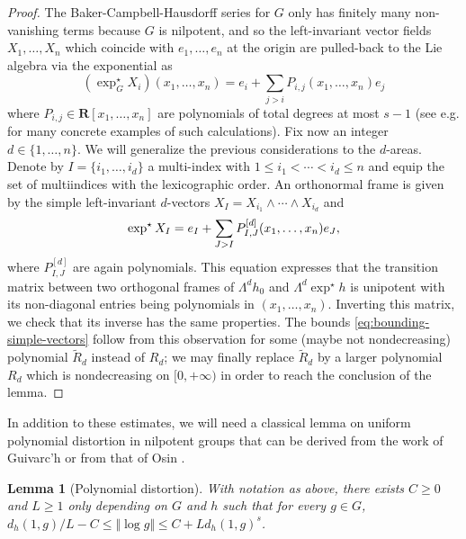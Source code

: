 \documentclass[12pt]{amsart}
\newtheorem{lem}[prop]{Lemma}
\theoremstyle{definition}
\begin{document}
\begin{proof}

The Baker-Campbell-Hausdorff series for $G$ only has finitely many non-vanishing terms because $G$ is nilpotent, and so the left-invariant vector fields $X_1,\ldots, X_n$ which coincide with $e_1, \ldots,e_n$ at the origin are pulled-back to the Lie algebra via the exponential as
\begin{equation}
\label{eq:bounding-simple-vectors-1}
     (\exp_G^\star X_i)(x_1,\ldots, x_n) = e_i + \sum_{j>i} P_{i,j}(x_1,\ldots, x_n) e_j 
\end{equation}
where $P_{i,j} \in \mathbf R[x_1,\ldots, x_n]$ are polynomials of total degrees at most $s -1$ (see e.g. \cite{LeDonneTripaldiCCLow} for many concrete examples of such calculations). 
Fix now an integer $d \in \{1,\ldots, n\}$. We will generalize the previous considerations to the $d$-areas. Denote by $I = \{i_1, \ldots, i_d \}$ a multi-index with $1 \leqslant i_1 < \cdots < i_d \leqslant n$ and equip the set of multiindices with the lexicographic order.  An orthonormal frame is given by the simple left-invariant $d$-vectors $X_I = X_{i_1} \wedge \cdots \wedge X_{i_d}$ and
\begin{equation}
     \operatorname{exp}^\star X_I = e_I + \sum_{J > I} P^{[d]}_{I,J}(x_1,\ldots, x_n) e_J, \notag
\end{equation}
where $P_{I,J}^{[d]}$ are again polynomials.
 This equation expresses that the transition matrix between two orthogonal frames of $\Lambda^d h_0$ and 
$\Lambda^d \exp^\star h$ is unipotent with its non-diagonal entries being polynomials in $(x_1, \ldots, x_n)$. Inverting this matrix, we check that its inverse has the same properties.
The bounds \eqref{eq:bounding-simple-vectors} follow from this observation for some (maybe not nondecreasing) polynomial $\widetilde R_d$ instead of $R_d$; we may finally replace $\widetilde R_d$ by a larger polynomial $R_d$ which is nondecreasing on $[0,+\infty)$ in order to reach the conclusion of the lemma.
\end{proof}


In addition to these estimates, we will need a classical lemma on uniform polynomial distortion in nilpotent groups that can be derived from the work of Guivarc'h or from that of Osin \cite{GuivNil,OsinNil}.

\begin{lem}[Polynomial distortion]
\label{lem:distortion}
    With notation as above, there exists $C\geqslant0$ and $L \geqslant 1$ only depending on $G$ and $h$ such that for every $g \in G$, $d_h(1,g)/L - C \leqslant \Vert \log g \Vert \leqslant C+ L d_h(1,g)^s$.
\end{lem}
\end{document}

